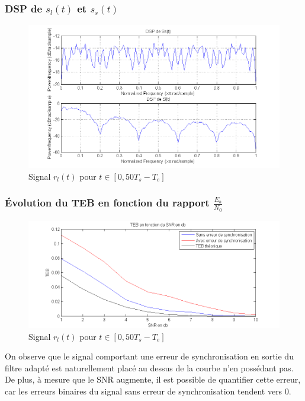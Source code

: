 \documentclass[11pt]{article}
\begin{document}
		\subsubsection{DSP de $s_l(t)$ et $s_s(t)$}
			\begin{figure}[h]
				\centering
				\includegraphics[scale=0.5]{images/Q314.png}
				\caption{Signal $r_l(t)$ pour $t \in [0, 50T_s-T_e]$}
				\label{Q314}
			\end{figure}
			
		
		\subsubsection{Évolution du TEB en fonction du rapport $\frac{E_b}{N_0}$}
			\begin{figure}[!ht]
				\centering
				\includegraphics[scale=0.5]{images/Q315-6.png}
				\caption{Signal $r_l(t)$ pour $t \in [0, 50T_s-T_e]$}
				\label{Q315-6}
			\end{figure}
			On observe que le signal comportant une erreur de synchronisation en sortie du filtre adapté est naturellement placé au dessus de la courbe n'en possédant pas.\\
			De plus, à mesure que le SNR augmente, il est possible de quantifier cette erreur, car les erreurs binaires du signal sans erreur de synchronisation tendent vers 0.
			
\end{document}
